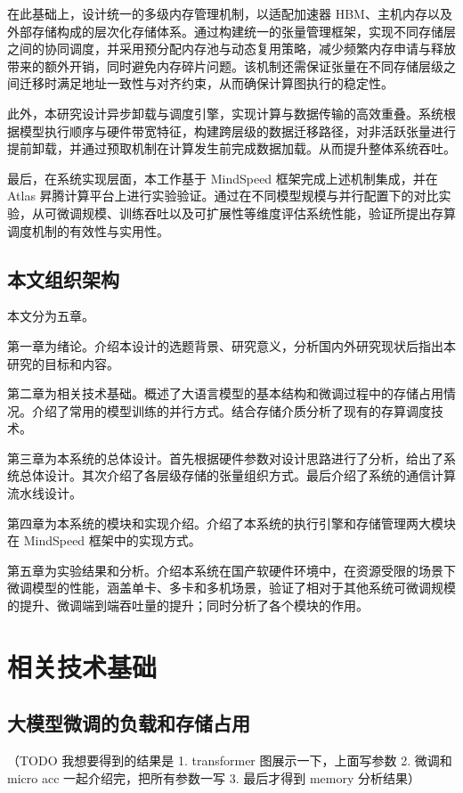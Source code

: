 \documentclass[bachelor,openany,oneside,color,AutoFakeBold=true]{buaathesis}
\begin{document}
在此基础上，设计统一的多级内存管理机制，以适配加速器 HBM、主机内存以及外部存储构成的层次化存储体系。通过构建统一的张量管理框架，实现不同存储层之间的协同调度，并采用预分配内存池与动态复用策略，减少频繁内存申请与释放带来的额外开销，同时避免内存碎片问题。该机制还需保证张量在不同存储层级之间迁移时满足地址一致性与对齐约束，从而确保计算图执行的稳定性。

此外，本研究设计异步卸载与调度引擎，实现计算与数据传输的高效重叠。系统根据模型执行顺序与硬件带宽特征，构建跨层级的数据迁移路径，对非活跃张量进行提前卸载，并通过预取机制在计算发生前完成数据加载。从而提升整体系统吞吐。

最后，在系统实现层面，本工作基于 MindSpeed 框架完成上述机制集成，并在 Atlas 昇腾计算平台上进行实验验证。通过在不同模型规模与并行配置下的对比实验，从可微调规模、训练吞吐以及可扩展性等维度评估系统性能，验证所提出存算调度机制的有效性与实用性。

\section{本文组织架构}
本文分为五章。

第一章为绪论。介绍本设计的选题背景、研究意义，分析国内外研究现状后指出本研究的目标和内容。

第二章为相关技术基础。概述了大语言模型的基本结构和微调过程中的存储占用情况。介绍了常用的模型训练的并行方式。结合存储介质分析了现有的存算调度技术。

第三章为本系统的总体设计。首先根据硬件参数对设计思路进行了分析，给出了系统总体设计。其次介绍了各层级存储的张量组织方式。最后介绍了系统的通信计算流水线设计。

第四章为本系统的模块和实现介绍。介绍了本系统的执行引擎和存储管理两大模块在 MindSpeed 框架中的实现方式。

第五章为实验结果和分析。介绍本系统在国产软硬件环境中，在资源受限的场景下微调模型的性能，涵盖单卡、多卡和多机场景，验证了相对于其他系统可微调规模的提升、微调端到端吞吐量的提升；同时分析了各个模块的作用。

\chapter{相关技术基础}
\section{大模型微调的负载和存储占用}

（TODO 我想要得到的结果是 1. transformer 图展示一下，上面写参数 2. 微调和 micro acc 一起介绍完，把所有参数一写 3. 最后才得到 memory 分析结果）
\end{document}
